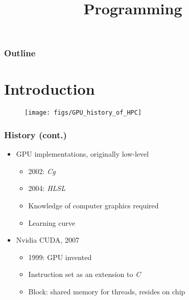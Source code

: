 
\title{Programming}
\begin{frame}\logoTree
	\institute{}
	\titlepage
\end{frame}

\begin{frame}\frametitle{Outline}\logoTree
	\setcounter{tocdepth}{1}	
	\tableofcontents
\end{frame}




\section{Introduction}
\begin{frame}[plain]\logoEvolution\mypagenum
	\begin{changemargin}{-1.3in}{0in}
		\begin{figure}
			\texttt{[image: figs/GPU\_history\_of\_HPC]}
		\end{figure}	
	\end{changemargin}
\end{frame}



\begin{frame}\frametitle{History (cont.)}\logoEvolution\mypagenum
	\begin{itemize}
	\item GPU implementations, originally low-level %
		\begin{itemize}
			\item 2002: \emph{Cg}
			\item 2004: \emph{HLSL}
			\item Knowledge of computer graphics required
			\item Learning curve
		\end{itemize}
	\item Nvidia CUDA, 2007
		\begin{itemize}
			\item 1999: GPU invented
			\item Instruction set as an extension to \emph{C}
			\item Block: shared memory for threads, resides on chip
		\end{itemize}	
	\end{itemize}
\end{frame}


